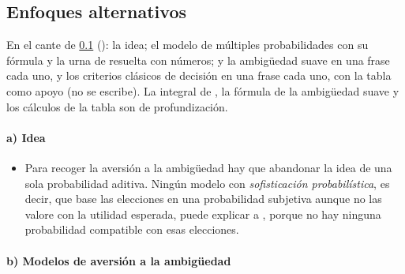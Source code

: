 \documentclass[11pt]{article}
\begin{document}
\subsection{Enfoques alternativos}\label{sec:alternativas-incertidumbre}

\begin{notaopositor}
En el cante de \ref{sec:alternativas-incertidumbre} (): la idea; el modelo de múltiples probabilidades con su fórmula y la urna de  resuelta con números;  y la ambigüedad suave en una frase cada uno, y los criterios clásicos de decisión en una frase cada uno, con la tabla como apoyo (no se escribe). La integral de , la fórmula de la ambigüedad suave y los cálculos de la tabla son de profundización.
\end{notaopositor}

\paragraph{a) Idea}

\begin{itemize}
\item Para recoger la aversión a la ambigüedad hay que abandonar la idea de una sola probabilidad aditiva. Ningún modelo con \emph{sofisticación probabilística}, es decir, que base las elecciones en una probabilidad subjetiva aunque no las valore con la utilidad esperada\nocite{MachinaSchmeidler1992More}, puede explicar a , porque no hay ninguna probabilidad compatible con esas elecciones.
\end{itemize}

\paragraph{b) Modelos de aversión a la ambigüedad}
\end{document}

